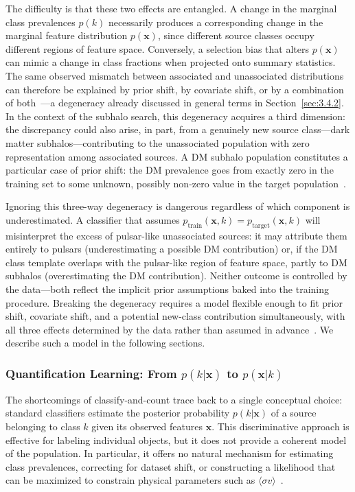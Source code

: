 The difficulty is that these two effects are entangled.
A change in the marginal class prevalences $p(k)$ necessarily produces a corresponding change in the marginal feature distribution $p(\mathbf{x})$, since different source classes occupy different regions of feature space.
Conversely, a selection bias that alters $p(\mathbf{x})$ can mimic a change in class fractions when projected onto summary statistics.
The same observed mismatch between associated and unassociated distributions can therefore be explained by prior shift, by covariate shift, or by a combination of both~\cite{MorenoTorres2012AUV, Amerio:2025fhz}---a degeneracy already discussed in general terms in Section~\ref{sec:3.4.2}.
In the context of the subhalo search, this degeneracy acquires a third dimension: the discrepancy could also arise, in part, from a genuinely new source class---dark matter subhalos---contributing to the unassociated population with zero representation among associated sources.
A DM subhalo population constitutes a particular case of prior shift: the DM prevalence goes from exactly zero in the training set to some unknown, possibly non-zero value in the target population~\cite{Amerio:2025fhz}.

Ignoring this three-way degeneracy is dangerous regardless of which component is underestimated.
A classifier that assumes $p_\mathrm{train}(\mathbf{x}, k) = p_\mathrm{target}(\mathbf{x}, k)$ will misinterpret the excess of pulsar-like unassociated sources: it may attribute them entirely to pulsars (underestimating a possible DM contribution) or, if the DM class template overlaps with the pulsar-like region of feature space, partly to DM subhalos (overestimating the DM contribution).
Neither outcome is controlled by the data---both reflect the implicit prior assumptions baked into the training procedure.
Breaking the degeneracy requires a model flexible enough to fit prior shift, covariate shift, and a potential new-class contribution simultaneously, with all three effects determined by the data rather than assumed in advance~\cite{Amerio:2025fhz}.
We describe such a model in the following sections.

\subsubsection{Quantification Learning: From $p(k|\mathbf{x})$ to $p(\mathbf{x}|k)$}
\label{sec:5.5.3}

The shortcomings of classify-and-count trace back to a single conceptual choice: standard classifiers estimate the posterior probability $p(k|\mathbf{x})$ of a source belonging to class $k$ given its observed features $\mathbf{x}$.
This discriminative approach is effective for labeling individual objects, but it does not provide a coherent model of the population.
In particular, it offers no natural mechanism for estimating class prevalences, correcting for dataset shift, or constructing a likelihood that can be maximized to constrain physical parameters such as $\langle\sigma v\rangle$~\cite{Amerio:2025fhz}.

